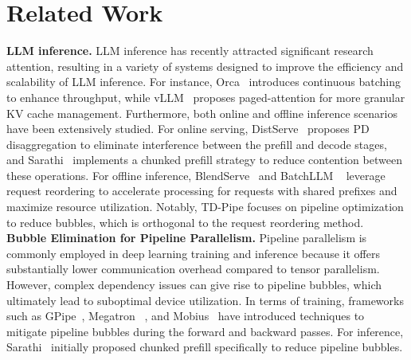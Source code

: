 \section{Related Work}


\textbf{LLM inference.} LLM inference has recently attracted significant research attention, resulting in a variety of systems designed to improve the efficiency and scalability of LLM inference. For instance, Orca~\cite{yu2022orca} introduces continuous batching to enhance throughput, while vLLM~\cite{vllm2024} proposes paged-attention for more granular KV cache management. Furthermore, both online and offline inference scenarios have been extensively studied. For online serving, DistServe~\cite{zhong2024distserve} proposes PD disaggregation to eliminate interference between the prefill and decode stages, and Sarathi~\cite{agrawal2024taming} implements a chunked prefill strategy to reduce contention between these operations. For offline inference, BlendServe~\cite{zhao2024blendserveoptimizingofflineinference} and BatchLLM ~\cite{zheng2025batchllmoptimizinglargebatched} leverage request reordering to accelerate processing for requests with shared prefixes and maximize resource utilization. 
Notably, TD-Pipe focuses on pipeline optimization to reduce bubbles, which is orthogonal to the request reordering method. \\
\textbf{Bubble Elimination for Pipeline Parallelism.} Pipeline parallelism is commonly employed in deep learning training and inference because it offers substantially lower communication overhead compared to tensor parallelism. However, complex dependency issues can give rise to pipeline bubbles, which ultimately lead to suboptimal device utilization. In terms of training, frameworks such as GPipe~\cite{huang2019gpipe}, Megatron ~\cite{narayanan2021efficient}, and Mobius~\cite{feng2023mobius} have introduced techniques to mitigate pipeline bubbles during the forward and backward passes. For inference, Sarathi~\cite{agrawal2024taming} initially proposed chunked prefill specifically to reduce pipeline bubbles.


